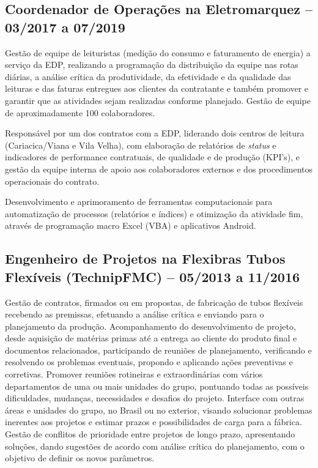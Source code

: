 \documentclass[]{article}
\begin{document}
\subsection{Coordenador de Operações na Eletromarquez -- 03/2017 a
07/2019}\label{coordenador-de-operauxe7uxf5es-na-eletromarquez-032017-a-072019}

Gestão de equipe de leituristas (medição do consumo e faturamento de
energia) a serviço da EDP, realizando a programação da distribuição da
equipe nas rotas diárias, a análise crítica da produtividade, da
efetividade e da qualidade das leituras e das faturas entregues aos
clientes da contratante e também promover e garantir que as atividades
sejam realizadas conforme planejado. Gestão de equipe de aproximadamente
100 colaboradores.

Responsável por um dos contratos com a EDP, liderando dois centros de
leitura (Cariacica/Viana e Vila Velha), com elaboração de relatórios de
\emph{status} e indicadores de performance contratuais, de qualidade e
de produção (KPI's), e gestão da equipe interna de apoio aos
colaboradores externos e dos procedimentos operacionais do contrato.

Desenvolvimento e aprimoramento de ferramentas computacionais para
automatização de processos (relatórios e índices) e otimização da
atividade fim, através de programação macro Excel (VBA) e aplicativos
Android.

\subsection{Engenheiro de Projetos na Flexibras Tubos Flexíveis
(TechnipFMC) -- 05/2013 a
11/2016}\label{engenheiro-de-projetos-na-flexibras-tubos-flexuxedveis-technipfmc-052013-a-112016}

Gestão de contratos, firmados ou em propostas, de fabricação de tubos
flexíveis recebendo as premissas, efetuando a análise crítica e enviando
para o planejamento da produção. Acompanhamento do desenvolvimento de
projeto, desde aquisição de matérias primas até a entrega ao cliente do
produto final e documentos relacionados, participando de reuniões de
planejamento, verificando e resolvendo os problemas eventuais, propondo
e aplicando ações preventivas e corretivas. Promover reuniões rotineiras
e extraordinárias com vários departamentos de uma ou mais unidades do
grupo, pontuando todas as possíveis dificuldades, mudanças, necessidades
e desafios do projeto. Interface com outras áreas e unidades do grupo,
no Brasil ou no exterior, visando solucionar problemas inerentes aos
projetos e estimar prazos e possibilidades de carga para a fábrica.
Gestão de conflitos de prioridade entre projetos de longo prazo,
apresentando soluções, dando sugestões de acordo com análise crítica do
planejamento, com o objetivo de definir os novos parâmetros.
\end{document}
